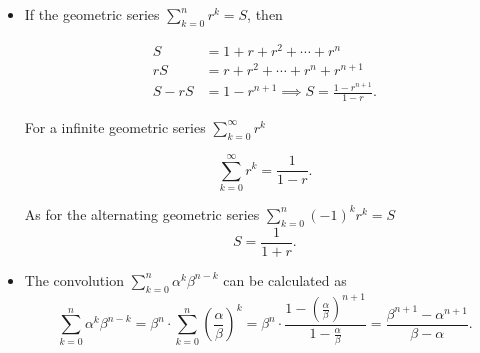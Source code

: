 \documentclass[a4paper]{article}
\begin{document}
\begin{itemize}
Therefore, $I = \sqrt{\dfrac{\pi}{a}}$.
Similarly, if the gaussian integral $$\int_{-\infty}^{\infty} e^{-at^2}u(t) dt = \sqrt{\frac{\pi}{2a}}$$.

\item If the geometric series $\sum_{k=0}^{n} r^k = S$, then

\begin{align*}
    S &= 1 + r + r^2 + \cdots + r^n \\
    rS &= r + r^2 + \cdots + r^n + r^{n+1} \\
    S - rS &= 1 - r^{n+1} \implies S = \frac{1 - r^{n+1}}{1 - r}.
\end{align*}

For a infinite geometric series $\sum_{k=0}^{\infty} r^k$

\begin{equation*}
    \sum_{k=0}^{\infty} r^k = \frac{1}{1 - r}.
\end{equation*}

As for the alternating geometric series $\sum_{k=0}^{n} (-1)^k r^k = S$
\begin{equation*}
    S = \frac{1}{1 + r}.
\end{equation*}


\item The convolution $\sum_{k=0}^{n}\alpha^k \beta^{n-k}$ can be calculated as
\begin{equation*}
    \sum_{k=0}^{n}\alpha^k \beta^{n-k} = \beta^n \cdot \sum_{k=0}^{n} \left(\frac{\alpha}{\beta}\right)^k = \beta^n \cdot \frac{1 - \left(\frac{\alpha}{\beta}\right)^{n+1}}{1 - \frac{\alpha}{\beta}} = \frac{\beta^{n+1} - \alpha^{n+1}}{\beta - \alpha}.
\end{equation*}

\end{itemize}
\end{document}
